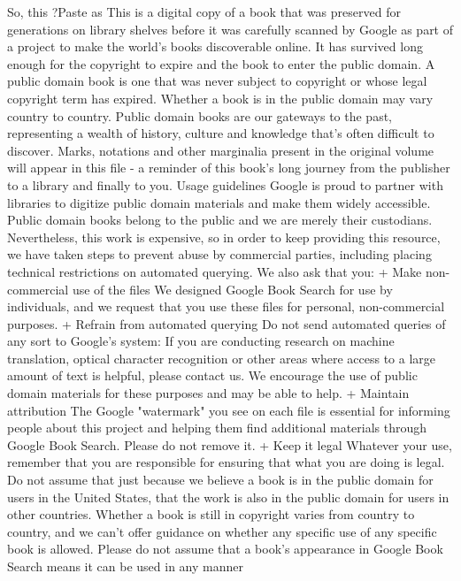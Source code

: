 \documentclass[a4paper]{article}
\begin{document}
So, this ?Paste as %
This is a digital copy of a book that was preserved for generations on library shelves before it was carefully scanned by Google as part of a project 
to make the world's books discoverable online. 
It has survived long enough for the copyright to expire and the book to enter the public domain. A public domain book is one that was never subject 
to copyright or whose legal copyright term has expired. Whether a book is in the public domain may vary country to country. Public domain books 
are our gateways to the past, representing a wealth of history, culture and knowledge that's often difficult to discover. 
Marks, notations and other marginalia present in the original volume will appear in this file - a reminder of this book's long journey from the 
publisher to a library and finally to you. 
Usage guidelines 
Google is proud to partner with libraries to digitize public domain materials and make them widely accessible. Public domain books belong to the 
public and we are merely their custodians. Nevertheless, this work is expensive, so in order to keep providing this resource, we have taken steps to 
prevent abuse by commercial parties, including placing technical restrictions on automated querying. 
We also ask that you: 
+ Make non-commercial use of the files We designed Google Book Search for use by individuals, and we request that you use these files for 
personal, non-commercial purposes. 
+ Refrain from automated querying Do not send automated queries of any sort to Google's system: If you are conducting research on machine 
translation, optical character recognition or other areas where access to a large amount of text is helpful, please contact us. We encourage the 
use of public domain materials for these purposes and may be able to help. 
+ Maintain attribution The Google "watermark" you see on each file is essential for informing people about this project and helping them find 
additional materials through Google Book Search. Please do not remove it. 
+ Keep it legal Whatever your use, remember that you are responsible for ensuring that what you are doing is legal. Do not assume that just 
because we believe a book is in the public domain for users in the United States, that the work is also in the public domain for users in other 
countries. Whether a book is still in copyright varies from country to country, and we can't offer guidance on whether any specific use of 
any specific book is allowed. Please do not assume that a book's appearance in Google Book Search means it can be used in any manner 
\end{document}
